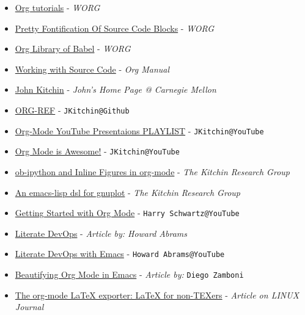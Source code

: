 \documentclass[openleft,oneside,showtrims]{memoir}
\begin{document}
\begin{itemize}
\item \href{https://orgmode.org/worg/org-tutorials/index.html}{Org tutorials} - \emph{WORG}

\item \href{https://orgmode.org/worg/org-contrib/babel/examples/fontify-src-code-blocks.html\#org42aa49f}{Pretty Fontification Of Source Code Blocks} - \emph{WORG}

\item \href{https://orgmode.org/worg/library-of-babel.html}{Org Library of Babel} - \emph{WORG}

\item \href{https://orgmode.org/manual/Working-with-Source-Code.html\#Working-with-Source-Code}{Working with Source Code} - \emph{Org Manual}

\item \href{https://www.cheme.engineering.cmu.edu/directory/bios/kitchin-john.html}{John Kitchin} - \emph{John's Home Page @ Carnegie Mellon}

\item \href{https://github.com/jkitchin/org-ref}{ORG-REF} - \texttt{JKitchin@Github}

\item \href{https://www.youtube.com/playlist?list=PL0sMmOaE\_gs3GbuZV\_sNjwMREw9rfElTV}{Org-Mode YouTube Presentaions PLAYLIST} - \texttt{JKitchin@YouTube}

\item \href{https://youtu.be/fgizHHd7nOo}{Org Mode is Awesome!} - \texttt{JKitchin@YouTube}

\item \href{https://kitchingroup.cheme.cmu.edu/blog/2017/01/29/ob-ipython-and-inline-figures-in-org-mode/}{ob-ipython and Inline Figures in org-mode} - \emph{The Kitchin Research Group}

\item \href{https://kitchingroup.cheme.cmu.edu/blog/2017/05/04/An-emacs-lisp-dsl-for-gnuplot/}{An emacs-lisp dsl for gnuplot} - \emph{The Kitchin Research Group}

\item \href{https://youtu.be/SzA2YODtgK4}{Getting Started with Org Mode} - \texttt{Harry Schwartz@YouTube}

\item \href{http://howardism.org/Technical/Emacs/literate-devops.html}{Literate DevOps} - \emph{Article by: Howard Abrams}

\item \href{https://youtu.be/dljNabciEGg}{Literate DevOps with Emacs} - \texttt{Howard Abrams@YouTube}

\item \href{https://zzamboni.org/post/beautifying-org-mode-in-emacs/}{Beautifying Org Mode in Emacs} - \emph{Article by:} \texttt{Diego Zamboni}

\item \href{https://www.linuxjournal.com/content/org-mode-latex-exporter-latex-non-texers}{The org-mode \LaTeX{} exporter: \LaTeX{} for non-TEXers} - \emph{Article on LINUX Journal}
\end{itemize}
\end{document}
